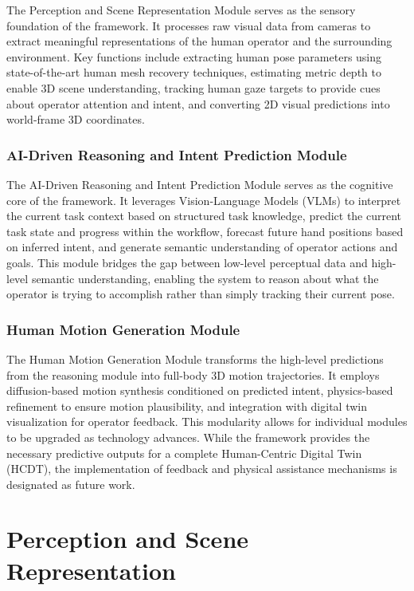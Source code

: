 The Perception and Scene Representation Module serves as the sensory foundation of the framework. It processes raw visual data from cameras to extract meaningful representations of the human operator and the surrounding environment. Key functions include extracting human pose parameters using state-of-the-art human mesh recovery techniques, estimating metric depth to enable 3D scene understanding, tracking human gaze targets to provide cues about operator attention and intent, and converting 2D visual predictions into world-frame 3D coordinates.

\subsubsection{AI-Driven Reasoning and Intent Prediction Module}

The AI-Driven Reasoning and Intent Prediction Module serves as the cognitive core of the framework. It leverages Vision-Language Models (VLMs) to interpret the current task context based on structured task knowledge, predict the current task state and progress within the workflow, forecast future hand positions based on inferred intent, and generate semantic understanding of operator actions and goals. This module bridges the gap between low-level perceptual data and high-level semantic understanding, enabling the system to reason about what the operator is trying to accomplish rather than simply tracking their current pose.

\subsubsection{Human Motion Generation Module}

The Human Motion Generation Module transforms the high-level predictions from the reasoning module into full-body 3D motion trajectories. It employs diffusion-based motion synthesis conditioned on predicted intent, physics-based refinement to ensure motion plausibility, and integration with digital twin visualization for operator feedback. This modularity allows for individual modules to be upgraded as technology advances. While the framework provides the necessary predictive outputs for a complete Human-Centric Digital Twin (HCDT), the implementation of feedback and physical assistance mechanisms is designated as future work.

\section{Perception and Scene Representation}
\label{sec:perception_scene}

